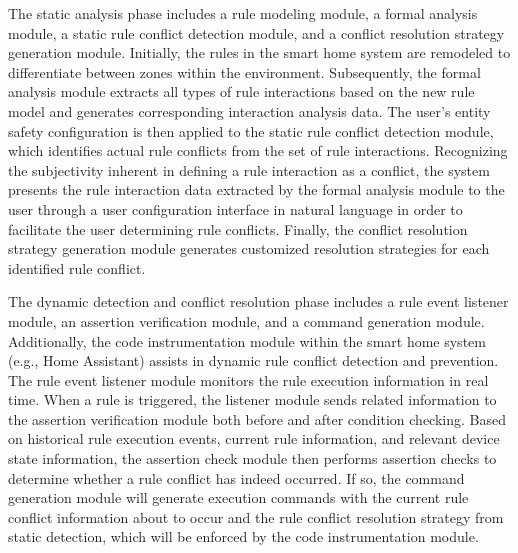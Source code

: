 The static analysis phase includes a rule modeling module, a formal analysis module, a static rule conflict detection module, and a conflict resolution strategy generation module. Initially, the rules in the smart home system are remodeled to differentiate between zones within the environment. Subsequently, the formal analysis module extracts all types of rule interactions based on the new rule model and generates corresponding interaction analysis data. The user's entity safety configuration is then applied to the static rule conflict detection module, which identifies actual rule conflicts from the set of rule interactions. Recognizing the subjectivity inherent in defining a rule interaction as a conflict, the system presents the rule interaction data extracted by the formal analysis module to the user through a user configuration interface in natural language in order to facilitate the user determining rule conflicts. Finally, the conflict resolution strategy generation module generates customized resolution strategies for each identified rule conflict.

The dynamic detection and conflict resolution phase includes a rule event listener module, an assertion verification module, and a command generation module. Additionally, the code instrumentation module within the smart home system (e.g., Home Assistant) assists in dynamic rule conflict detection and prevention. The rule event listener module monitors the rule execution information in real time. When a rule is triggered, the listener module sends related information to the assertion verification module both before and after condition checking. Based on historical rule execution events, current rule information, and relevant device state information, the assertion check module then performs assertion checks to determine whether a rule conflict has indeed occurred. If so, the command generation module will generate execution commands with the current rule conflict information about to occur and the rule conflict resolution strategy from static detection, which will be enforced by the code instrumentation module.

